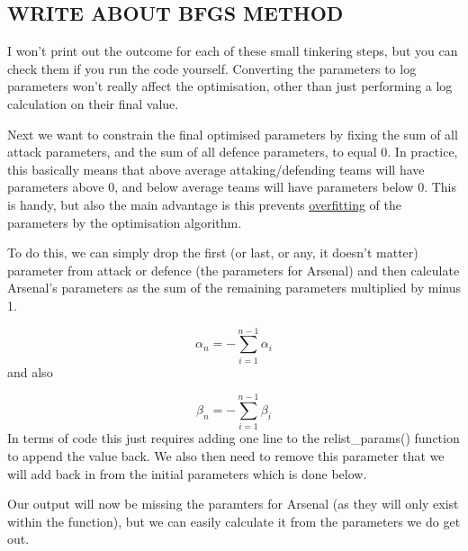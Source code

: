 \documentclass[]{article}
\begin{document}
\subsection{WRITE ABOUT BFGS METHOD}\label{write-about-bfgs-method}

I won't print out the outcome for each of these small tinkering steps,
but you can check them if you run the code yourself. Converting the
parameters to log parameters won't really affect the optimisation, other
than just performing a log calculation on their final value.

Next we want to constrain the final optimised parameters by fixing the
sum of all attack parameters, and the sum of all defence parameters, to
equal 0. In practice, this basically means that above average
attaking/defending teams will have parameters above 0, and below average
teams will have parameters below 0. This is handy, but also the main
advantage is this prevents
\href{https://en.wikipedia.org/wiki/Overfitting}{overfitting} of the
parameters by the optimisation algorithm.

To do this, we can simply drop the first (or last, or any, it doesn't
matter) parameter from attack or defence (the parameters for Arsenal)
and then calculate Arsenal's parameters as the sum of the remaining
parameters multiplied by minus 1.

\[\alpha_{n} = -\sum_{i = 1}^{n-1} \alpha_{i} \] and also

\[\beta_{n} = -\sum_{i = 1}^{n-1} \beta_{i} \] In terms of code this
just requires adding one line to the relist\_params() function to append
the value back. We also then need to remove this parameter that we will
add back in from the initial parameters which is done below.

Our output will now be missing the paramters for Arsenal (as they will
only exist within the function), but we can easily calculate it from the
parameters we do get out.
\end{document}
